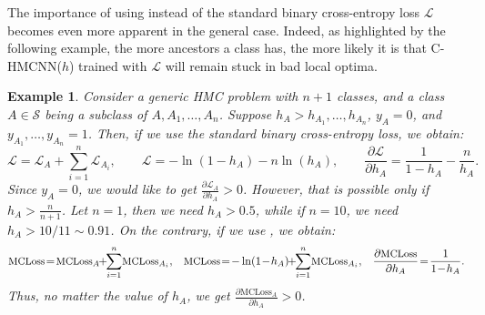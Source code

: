 \documentclass{article}
\newcommand{\lss}{\mathcal{L}}
\newcommand{\loss}{\text{MCLoss}}
\newcommand{\system}[1]{C-HMCNN(#1)}
\newtheorem{example}[theorem]{Example}
\begin{document}
 The importance of using \loss{} instead of the standard binary cross-entropy loss $\lss$ becomes even more apparent in the general case. Indeed, as highlighted by the following example, the more ancestors a class has, the more likely it is that \system{$h$} trained with $\lss$ will remain stuck in bad local optima.
\begin{example}{\rm
Consider a generic HMC problem with $n+1$ classes, and a class $A \in \mathcal{S}$ being a subclass of $A, A_1, \ldots, A_n$. Suppose $h_A > h_{A_1}, \ldots, h_{A_n}$, $y_A=0$, and $y_{A_1}, \ldots, y_{A_n}=1$. Then, if we use the standard binary cross-entropy loss, we obtain:
$$
\lss = \lss_{A} + \sum_{i=1}^n \lss_{A_i}, \qquad 
\lss = - \ln(1-h_A) - n\ln(h_A), \qquad
\frac{\partial \lss}{\partial h_A} = \frac{1}{1-h_A} - \frac{n}{h_A}.
$$
Since $y_A = 0$, we would like to get  $\frac{\partial \lss_A}{\partial h_A} > 0$. However, that is possible only if $h_A > \frac{n}{n+1}$. Let $n = 1$, then we need $h_A > 0.5$, while if $n = 10$, we need $h_A > 10/11 \sim 0.91$. On the contrary, if we use \loss{}, we obtain:
$$
{
\begin{aligned}
{\small \loss} \!=\! {\small \loss}_A \!\!+\!\! \sum_{i=1}^n\!{\small \loss}_{A_i}, \,\,\,\,\,
{\small \loss} \!=\! - \ln(1\!-\!h_A) \!\!+\!\! \sum_{i=1}^n \!{\small \loss}_{A_i}, \,\,\,\,\,
\frac{\partial {\small \loss}}{\partial h_A} \!=\! \frac{1}{1\!-\!h_A}.
\end{aligned}}
$$
Thus, no matter the value of $h_A$, we get $\frac{\partial \loss_A}{\partial h_A} > 0$.
}
\end{example}
\end{document}
